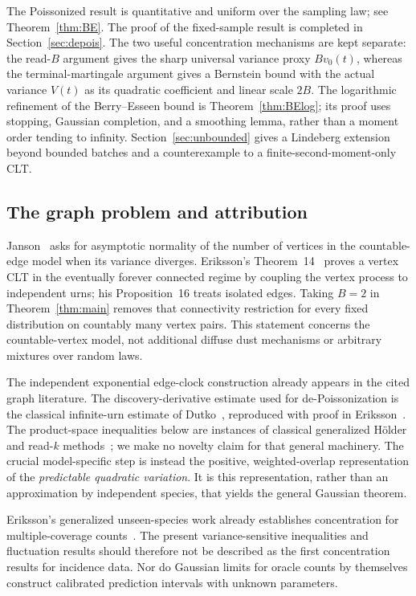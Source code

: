 \documentclass[11pt]{article}
\numberwithin{equation}{section}
\theoremstyle{definition}
\theoremstyle{remark}
\begin{document}
The Poissonized result is quantitative and uniform over the sampling law; see
Theorem~\ref{thm:BE}. The proof of the fixed-sample result is completed in
Section~\ref{sec:depois}. The two useful concentration mechanisms are kept
separate: the read-$B$ argument gives the sharp universal variance proxy $Bv_0(t)$,
whereas the terminal-martingale argument gives a Bernstein bound with the actual
variance $V(t)$ as its quadratic coefficient and linear scale $2B$.
The logarithmic refinement of the Berry--Esseen bound is
Theorem~\ref{thm:BElog}; its proof uses stopping, Gaussian completion, and a
smoothing lemma, rather than a moment order tending to infinity.
Section~\ref{sec:unbounded} gives a Lindeberg extension beyond bounded batches
and a counterexample to a finite-second-moment-only CLT.

\subsection{The graph problem and attribution}
Janson~\cite[Problem~6.9]{Janson} asks for asymptotic normality of the number of
vertices in the countable-edge model when its variance diverges. Eriksson's
Theorem~14~\cite{ErikssonGraphs} proves a vertex CLT in the eventually forever
connected regime by coupling the vertex process to independent urns; his
Proposition~16 treats isolated edges. Taking $B=2$ in Theorem~\ref{thm:main}
removes that connectivity restriction for every fixed distribution on countably
many vertex pairs. This statement concerns the countable-vertex model, not
additional diffuse dust mechanisms or arbitrary mixtures over random laws.

The independent exponential edge-clock construction already appears in the
cited graph literature. The discovery-derivative estimate used for
 de-Poissonization is the classical infinite-urn estimate of
Dutko~\cite{Dutko}, reproduced with proof in
Eriksson~\cite[Lemmas~29--33, especially Lemma~30]{ErikssonGraphs}.
The product-space inequalities below are instances of classical generalized
H\"older and read-$k$ methods~\cite{Finner,GLSS}; we make no novelty claim for
that general machinery. The crucial model-specific step is instead the
positive, weighted-overlap representation of the \emph{predictable quadratic
variation}. It is this representation, rather than an approximation by
independent species, that yields the general Gaussian theorem.

Eriksson's generalized unseen-species work already establishes concentration
for multiple-coverage counts~\cite[Lemma~29]{ErikssonSpecies}. The present
variance-sensitive inequalities and fluctuation results should therefore not
be described as the first concentration results for incidence data. Nor do
Gaussian limits for oracle counts by themselves construct calibrated prediction
intervals with unknown parameters.
\end{document}
